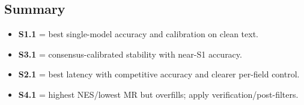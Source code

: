 \subsection*{Summary}

\begin{itemize}
    \item \textbf{S1.1} = best single-model accuracy and calibration on clean text.
    \item \textbf{S3.1} = consensus-calibrated stability with near-S1 accuracy.
    \item \textbf{S2.1} = best latency with competitive accuracy and clearer per-field control.
    \item \textbf{S4.1} = highest NES/lowest MR but overfills; apply verification/post-filters.
\end{itemize}
